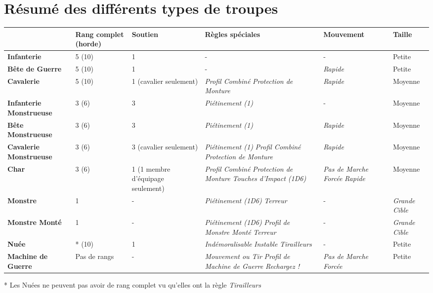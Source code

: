 \newpage
\section*{Résumé des différents types de troupes}

\renewcommand{\arraystretch}{1.48}
\begin{table}[!htbp]
\centering
\begin{tabular}{M{2.5cm}|M{2cm}M{2cm}M{3cm}M{2.3cm}M{2cm}}
 & \textbf{Rang complet (horde)} & \textbf{Soutien} & \textbf{Règles spéciales} & \textbf{Mouvement} & \textbf{Taille} \\
\hline
\textbf{Infanterie} & 5 (10) & 1 & - & - & Petite \\
\hline
\textbf{Bête de Guerre} & 5 (10) & 1 & - & \emph{Rapide} & Petite \\
\hline
\textbf{Cavalerie} & 5 (10) & 1 (cavalier seulement) & \emph{Profil Combiné} \newline \emph{Protection de Monture} & \emph{Rapide} & Moyenne \\
\hline
\textbf{Infanterie Monstrueuse} & 3 (6) & 3 & \emph{Piétinement (1)} & - & Moyenne \\
\hline
\textbf{Bête Monstrueuse} & 3 (6) & 3 & \emph{Piétinement (1)} & \emph{Rapide} & Moyenne \\
\hline
\textbf{Cavalerie Monstrueuse} & 3 (6) & 3 (cavalier seulement) & \emph{Piétinement (1)} \newline \emph{Profil Combiné} \newline \emph{Protection de Monture}  & \emph{Rapide} & Moyenne \\
\hline
\textbf{Char} & 3 (6) & 1 \newline (1 membre d'équipage seulement) & \emph{Profil Combiné} \newline \emph{Protection de Monture} \newline \emph{Touches d'Impact (1D6)} & \emph{Pas de Marche Forcée} \newline \emph{Rapide} & Moyenne \\
\hline
\textbf{Monstre} & 1 & - & \emph{Piétinement (1D6)} \newline \emph{Terreur} & - & \emph{Grande Cible} \\
\hline
\textbf{Monstre Monté} & 1 & - & \emph{Piétinement (1D6)} \newline \emph{Profil de Monstre Monté} \newline \emph{Terreur} & - & \emph{Grande Cible} \\
\hline
\textbf{Nuée} & * (10) & 1 & \emph{Indémoralisable} \newline \emph{Instable} \newline \emph{Tirailleurs} & - & Petite \\
\hline
\textbf{Machine de Guerre} & Pas de rangs & - & \emph{Mouvement ou Tir} \newline \emph{Profil de Machine de Guerre} \newline \emph{Rechargez !} & \emph{Pas de Marche Forcée} & Petite \\
\hline
\end{tabular}
* Les Nuées ne peuvent pas avoir de rang complet vu qu'elles ont la règle \emph{Tirailleurs}
\end{table}
\renewcommand{\arraystretch}{1.5}